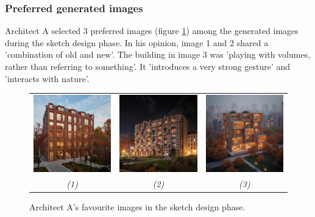 \subsubsection{Preferred generated images}
Architect A selected 3 preferred images (figure \ref{fig:A-sketch-favourite}) among the generated images during the sketch design phase. In his opinion, image 1 and 2 shared a 'combination of old and new'. The building in image 3 was 'playing with volumes, rather than referring to something'. It 'introduces a very strong gesture' and 'interacts with nature'.
\begin{figure}[H]
    \centering
    \begin{tabular}{ccc}
         \includegraphics[width=0.3\linewidth]{Images/Results/Architect A/1. sketch phase/Met_lora_00126_.png}
         & \includegraphics[width=0.3\linewidth]{Images/Results/Architect A/1. sketch phase/Met_lora_00139_.png}
         & \includegraphics[width=0.3\linewidth]{Images/Results/Architect A/1. sketch phase/Zonder_lora_00144_.png}\\
         \textit{(1)} & \textit{(2)} & \textit{(3)}
    \end{tabular}
    \caption{Architect A's favourite images in the sketch design phase.}
    \label{fig:A-sketch-favourite}
\end{figure}
